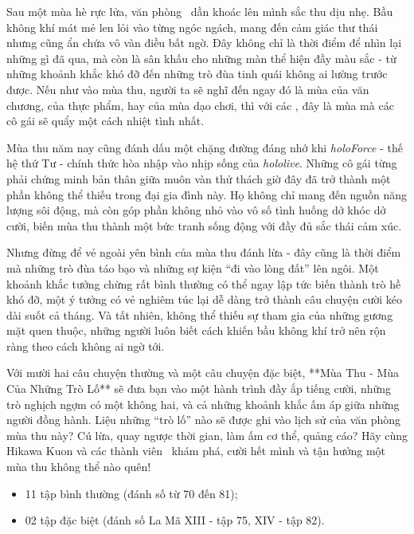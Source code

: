 \documentclass[main.tex]{subfiles}
\begin{document}
Sau một mùa hè rực lửa, văn phòng \hll\ dần khoác lên mình sắc thu dịu nhẹ. Bầu không khí mát mẻ len lỏi vào từng ngóc ngách, mang đến cảm giác thư thái nhưng cũng ẩn chứa vô vàn điều bất ngờ. Đây không chỉ là thời điểm để nhìn lại những gì đã qua, mà còn là sân khấu cho những màn thể hiện đầy màu sắc - từ những khoảnh khắc khó đỡ đến những trò đùa tinh quái không ai lường trước được. Nếu như vào mùa thu, người ta sẽ nghĩ đến ngay đó là mùa của văn chương, của thực phẩm, hay của mùa dạo chơi, thì với các \hll, đây là mùa mà các cô gái sẽ quẩy một cách nhiệt tình nhất.

Mùa thu năm nay cũng đánh dấu một chặng đường đáng nhớ khi \textit{holoForce} - thế hệ thứ Tư - chính thức hòa nhập vào nhịp sống của \textit{hololive}. Những cô gái từng phải chứng minh bản thân giữa muôn vàn thử thách giờ đây đã trở thành một phần không thể thiếu trong đại gia đình này. Họ không chỉ mang đến nguồn năng lượng sôi động, mà còn góp phần không nhỏ vào vô số tình huống dở khóc dở cười, biến mùa thu thành một bức tranh sống động với đầy đủ sắc thái cảm xúc.

Nhưng đừng để vẻ ngoài yên bình của mùa thu đánh lừa - đây cũng là thời điểm mà những trò đùa táo bạo và những sự kiện ``đi vào lòng đất'' lên ngôi. Một khoảnh khắc tưởng chừng rất bình thường có thể ngay lập tức biến thành trò hề khó đỡ, một ý tưởng có vẻ nghiêm túc lại dễ dàng trở thành câu chuyện cười kéo dài suốt cả tháng. Và tất nhiên, không thể thiếu sự tham gia của những gương mặt quen thuộc, những người luôn biết cách khiến bầu không khí trở nên rộn ràng theo cách không ai ngờ tới.

Với mười hai câu chuyện thường và một câu chuyện đặc biệt, **Mùa Thu - Mùa Của Những Trò Lố** sẽ đưa bạn vào một hành trình đầy ắp tiếng cười, những trò nghịch ngợm có một không hai, và cả những khoảnh khắc ấm áp giữa những người đồng hành. Liệu những ``trò lố'' nào sẽ được ghi vào lịch sử của văn phòng mùa thu này? Cú lừa, quay ngược thời gian, làm ấm cơ thể, quảng cáo? Hãy cùng Hikawa Kuon và các thành viên \hll\ khám phá, cười hết mình và tận hưởng một mùa thu không thể nào quên!

{}
\begin{itemize}
    \item 11 tập bình thường (đánh số từ 70 đến 81);
    \item 02 tập đặc biệt (đánh số La Mã XIII - tập 75, XIV - tập 82).
\end{itemize}
\end{document}

